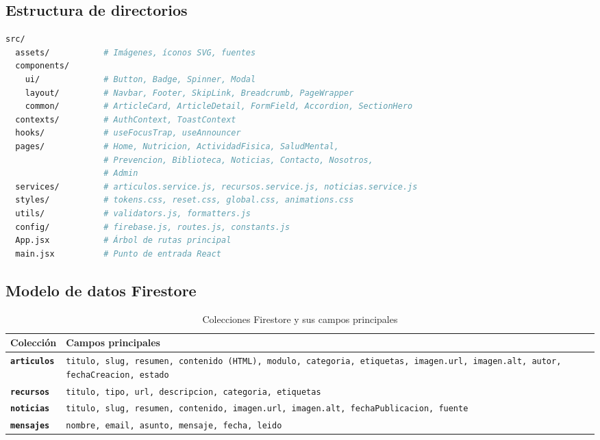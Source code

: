 \documentclass[12pt, a4paper]{article}
\begin{document}
\subsection{Estructura de directorios}

\begin{lstlisting}[language=bash, caption={Árbol de directorios de \texttt{src/}}]
src/
  assets/           # Imágenes, íconos SVG, fuentes
  components/
    ui/             # Button, Badge, Spinner, Modal
    layout/         # Navbar, Footer, SkipLink, Breadcrumb, PageWrapper
    common/         # ArticleCard, ArticleDetail, FormField, Accordion, SectionHero
  contexts/         # AuthContext, ToastContext
  hooks/            # useFocusTrap, useAnnouncer
  pages/            # Home, Nutricion, ActividadFisica, SaludMental,
                    # Prevencion, Biblioteca, Noticias, Contacto, Nosotros,
                    # Admin
  services/         # articulos.service.js, recursos.service.js, noticias.service.js
  styles/           # tokens.css, reset.css, global.css, animations.css
  utils/            # validators.js, formatters.js
  config/           # firebase.js, routes.js, constants.js
  App.jsx           # Árbol de rutas principal
  main.jsx          # Punto de entrada React
\end{lstlisting}

\subsection{Modelo de datos Firestore}

\begin{table}[H]
\centering
\caption{Colecciones Firestore y sus campos principales}
\begin{tabular}{@{}>{\bfseries}p{2.5cm} p{11cm}@{}}
\toprule
\rowcolor{royalblue!12}
\textbf{Colección} & \textbf{Campos principales} \\
\midrule
\texttt{articulos} & \texttt{titulo, slug, resumen, contenido (HTML), modulo, categoria, etiquetas, imagen.url, imagen.alt, autor, fechaCreacion, estado} \\
\texttt{recursos} & \texttt{titulo, tipo, url, descripcion, categoria, etiquetas} \\
\texttt{noticias} & \texttt{titulo, slug, resumen, contenido, imagen.url, imagen.alt, fechaPublicacion, fuente} \\
\texttt{mensajes} & \texttt{nombre, email, asunto, mensaje, fecha, leido} \\
\bottomrule
\end{tabular}
\end{table}
\end{document}
